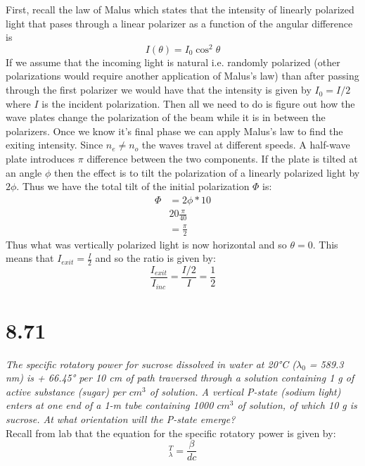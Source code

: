 \documentclass[a4paper, 11pt]{article}
\begin{document}
First, recall the law of Malus which states that the intensity of linearly polarized light that pases through a linear polarizer as a function of the angular difference is 
	\begin{equation*}
		I(\theta) = I_0\cos^2\theta
	\end{equation*}
If we assume that the incoming light is natural i.e. randomly polarized (other polarizations would require another application of Malus's law) than after passing through the first polarizer we would have that the intensity is given by $I_0 = I/2$ where $I$ is the incident polarization. Then all we need to do is figure out how the wave plates change the polarization of the beam while it is in between the polarizers. Once we know it's final phase we can apply Malus's law to find the exiting intensity. Since $n_e \neq n_o$ the waves travel at different speeds. A half-wave plate introduces $\pi$ difference between the two components. If the plate is tilted at an angle $\phi$ then the effect is to tilt the polarization of a linearly polarized light by $2\phi$. Thus we have the total tilt of the initial polarization $\Phi$ is:
	\begin{align*}
		\Phi &= 2\phi*10 \\ 
			& 20\frac{\pi}{40} \\
			& = \frac{\pi}{2}
	\end{align*}
Thus what was vertically polarized light is now horizontal and so $\theta = 0$. This means that $I_{exit} = \frac{I}{2}$ and so the ratio is given by: 
	\begin{equation*}
		\frac{I_{exit}}{I_{inc}} = \frac{I/2}{I} = \frac{1}{2}
	\end{equation*}
	
\section*{8.71}
\textit{The specific rotatory power for sucrose dissolved in water at
	20°C ($\lambda_0$ = 589.3 nm) is + 66.45° per 10 cm of path traversed through
	a solution containing 1 g of active substance (sugar) per $cm^3$ of solution. A vertical P-state (sodium light) enters at one end of a 1-m tube
	containing 1000 $cm^3$ of solution, of which 10 g is sucrose. At what
	orientation will the P-state emerge?}\\

Recall from lab that the equation for the specific rotatory power is given by: 
	\begin{equation*}
		[\alpha]_\lambda^T = \frac{\beta}{dc}
	\end{equation*}
	
\end{document}
